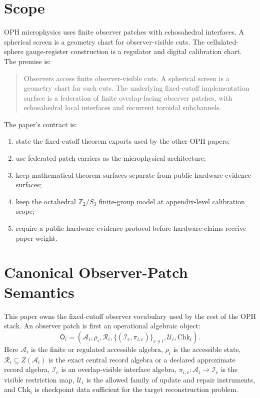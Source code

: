 \documentclass[11pt]{article}
\theoremstyle{remark}
\theoremstyle{plain}
\begin{document}
\tableofcontents
\newpage

\section{Scope}

OPH microphysics uses finite observer patches with echosahedral interfaces. A spherical screen is
a geometry chart for observer-visible cuts. The cellulated-sphere gauge-register construction is a
regulator and digital calibration chart. The premise is:
\begin{quote}
Observers access finite observer-visible cuts. A spherical screen is a geometry chart for such
cuts. The underlying fixed-cutoff implementation surface is a federation of finite
overlap-facing observer patches, with echosahedral local interfaces and recurrent toroidal
subchannels.
\end{quote}

The paper's contract is:
\begin{enumerate}[leftmargin=2em]
\item state the fixed-cutoff theorem exports used by the other OPH papers;
\item use federated patch carriers as the microphysical architecture;
\item keep mathematical theorem surfaces separate from public hardware evidence surfaces;
\item keep the octahedral \(\mathbb Z_2/S_3\) finite-group model at appendix-level calibration scope;
\item require a public hardware evidence protocol before hardware claims receive paper
weight.
\end{enumerate}

\section{Canonical Observer-Patch Semantics}

This paper owns the fixed-cutoff observer vocabulary used by the rest of the OPH stack. An
observer patch is first an operational algebraic object:
\[
\mathsf O_i=
\left(
\mathcal A_i,\rho_i,\mathcal R_i,
\{(\mathcal I_e,\pi_{i,e})\}_{e\ni i},
\mathcal U_i,\mathrm{Chk}_i
\right).
\]
Here \(\mathcal A_i\) is the finite or regulated accessible algebra, \(\rho_i\) is the accessible
state, \(\mathcal R_i\subseteq Z(\mathcal A_i)\) is the exact central record algebra or a declared
approximate record algebra, \(\mathcal I_e\) is an overlap-visible interface algebra,
\(\pi_{i,e}:\mathcal A_i\to\mathcal I_e\) is the visible restriction map, \(\mathcal U_i\) is the
allowed family of update and repair instruments, and \(\mathrm{Chk}_i\) is checkpoint data
sufficient for the target reconstruction problem.
\end{document}
